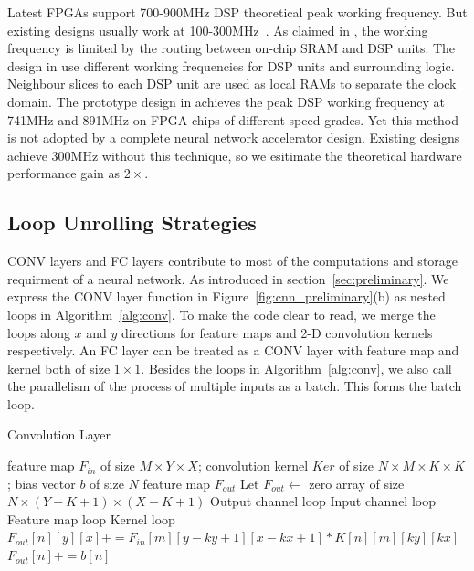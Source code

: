 Latest FPGAs support 700-900MHz DSP theoretical peak working frequency. But existing designs usually work at 100-300MHz~\cite{qiu2016going, guo2017angel, zhang2016caffeine, ma2017optimizing}. As claimed in \cite{wu2017high}, the working frequency is limited by the routing between on-chip SRAM and DSP units. The design in \cite{wu2017high} use different working frequencies for DSP units and surrounding logic. Neighbour slices to each DSP unit are used as local RAMs to separate the clock domain. The prototype design in \cite{wu2017high} achieves the peak DSP working frequency at 741MHz and 891MHz on FPGA chips of different speed grades. Yet this method is not adopted by a complete neural network accelerator design. Existing designs achieve 300MHz without this technique, so we esitimate the theoretical hardware performance gain as $2\times$.

\subsection{Loop Unrolling Strategies}\label{sec:hardware:lu}
CONV layers and FC layers contribute to most of the computations and storage requirment of a neural network. As introduced in section~\ref{sec:preliminary}. We express the CONV layer function in Figure~\ref{fig:cnn_preliminary}(b) as nested loops in Algorithm~\ref{alg:conv}. To make the code clear to read, we merge the loops along $x$ and $y$ directions for feature maps and 2-D convolution kernels respectively. An FC layer can be treated as a CONV layer with feature map and kernel both of size $1\times 1$. Besides the loops in Algorithm~\ref{alg:conv}, we also call the parallelism of the process of multiple inputs as a batch. This forms the batch loop.

\begin{algorithm}  
    \caption{Convolution Layer}
    \label{alg:conv}
    \begin{algorithmic}[1]
        \Require feature map $F_{in}$ of size $M\times Y\times X$; 
                 convolution kernel $Ker$ of size $N\times M\times K\times K$;
                 bias vector $b$ of size $N$ 
        \Ensure  feature map $F_{out}$
            \State Let $F_{out} \gets $ zero array of size $N\times(Y-K+1)\times(X-K+1)$  
             \Comment Output channel loop
                 \Comment Input channel loop
                     \Comment Feature map loop
                         \Comment Kernel loop
                            \State $F_{out}[n][y][x] += F_{in}[m][y-ky+1][x-kx+1] * K[n][m][ky][kx]$
                        \EndFor
                    \EndFor
                \EndFor
                \State $F_{out}[n] += b[n]$
            \EndFor
            \State {}
        \EndFunction  
        
    \end{algorithmic}  
\end{algorithm}

